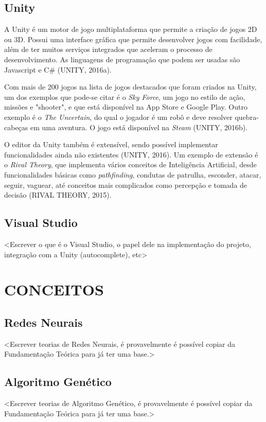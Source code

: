 \documentclass[12pt,a4paper]{article}
\begin{document}
	\subsection{Unity}
		A Unity é um motor de jogo multiplataforma que permite a criação de jogos 2D ou 3D.
		Possui uma interface gráfica que permite desenvolver jogos com facilidade,
		além de ter muitos serviços integrados que aceleram o processo de desenvolvimento.
		As linguagens de programação que podem ser usadas são Javascript e C\#
		(UNITY, 2016a).
		
		Com mais de 200 jogos na lista de jogos destacados que foram criados na Unity,
		um dos exemplos que pode-se citar é o \textit{Sky Force},
		um jogo no estilo de ação, missões e "shooter",
		e que está disponível na App Store e Google Play.
		Outro exemplo é o \textit{The Uncertain},
		do qual o jogador é um robô e
		deve resolver quebra-cabeças em uma aventura.
		O jogo está disponível na \textit{Steam}
		(UNITY, 2016b).
		
		O editor da Unity também é extensível, sendo possível implementar funcionalidades ainda não existentes
		(UNITY, 2016).
		Um exemplo de extensão é o \textit{Rival Theory},
		que implementa vários conceitos de Inteligência Artificial,
		desde funcionalidades básicas como \textit{pathfinding},
		condutas de patrulha, esconder, atacar, seguir, vaguear,
		até conceitos mais complicados como percepção e tomada de decisão
		(RIVAL THEORY, 2015).

	\subsection{Visual Studio}
		<Escrever o que é o Visual Studio, o papel dele na implementação do projeto, integração com a Unity (autocomplete), etc>
	
\section{CONCEITOS}

	\subsection{Redes Neurais}
	<Escrever teorias de Redes Neurais, é provavelmente é possível copiar da Fundamentação Teórica para já ter uma base.>

	\subsection{Algoritmo Genético}
	<Escrever teorias de Algoritmo Genético, é provavelmente é possível copiar da Fundamentação Teórica para já ter uma base.>
\end{document}
